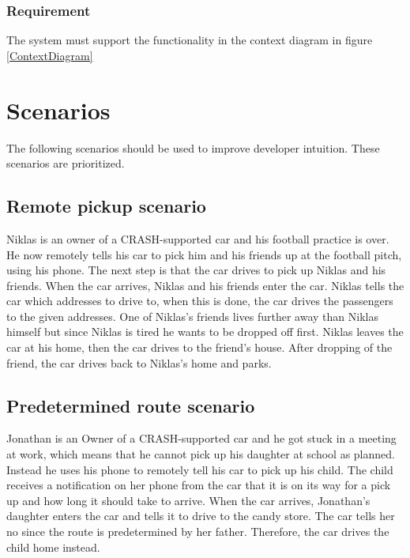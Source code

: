\documentclass{article}
\begin{document}
    \subsubsection{Requirement}
\hfill \break 
\- \- \-The system must support the functionality in the context diagram in figure \ref{ContextDiagram}


\section{Scenarios}
The following scenarios should be used to improve developer intuition. These scenarios are prioritized.
\subsection {Remote pickup scenario}
Niklas is an owner of a CRASH-supported car and his football practice is over. He now remotely tells his car to pick him and his friends up at the football pitch, using his phone. The next step is that the car drives to pick up Niklas and his friends. When the car arrives, Niklas and his friends enter the car. Niklas tells the car which addresses to drive to, when this is done, the car drives the passengers to the given addresses. One of Niklas's friends lives further away than Niklas himself but since Niklas is tired he wants to be dropped off first. Niklas leaves the car at his home, then the car drives to the friend's house. After dropping of the friend, the car drives back to Niklas's home and parks.

\subsection {Predetermined route scenario}
Jonathan is an Owner of a CRASH-supported car and he got stuck in a meeting at work, which means that he cannot pick up his daughter at school as planned. Instead he uses his phone to remotely tell his car to pick up his child. The child receives a notification on her phone from the car that it is on its way for a pick up and how long it should take to arrive. When the car arrives, Jonathan’s daughter enters the car and tells it to drive to the candy store. The car tells her no since the route is predetermined by her father. Therefore, the car drives the child home instead.
\end{document}
